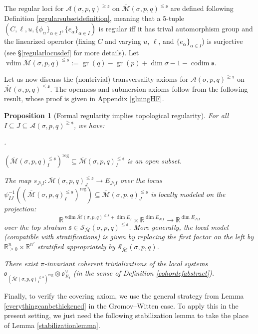 \documentclass[12pt]{article}
\newtheorem{proposition}[theorem]{Proposition}
\theoremstyle{definition}
\theoremstyle{remark}
\numberwithin{equation}{subsection}
\newcommand{\s}{\mathfrak s}
\newcommand{\oo}{\mathfrak o}
\newcommand{\RR}{\mathbb R}
\newcommand{\SSS}{\mathcal S}
\newcommand{\A}{\mathcal A}
\newcommand{\Mbar}{\overline{\mathcal M}}
\newcommand{\codim}{\operatorname{codim}}
\newcommand{\vdim}{\operatorname{vdim}}
\newcommand{\gr}{\operatorname{gr}}
\newcommand{\reg}{\mathrm{reg}}
\newcounter{rcounti}
\newenvironment{rlist}{\begin{list}{\roman{rcounti}.}{\usecounter{rcounti}
\setlength\itemsep{0pt}
\setlength\labelsep{4pt}
\setlength\labelwidth{16pt}
\setlength\leftmargin{32pt}
\setlength\listparindent{0pt}
\setlength\parsep{0pt}
\setlength\parskip{0pt}
\setlength\partopsep{0pt}
\setlength\rightmargin{0pt}
\setlength\topsep{0pt}
\setlength\itemindent{0pt}
}}{\end{list}}
\begin{document}
The regular loci for $\A(\sigma,p,q)^{\geq\s}$ on $\Mbar(\sigma,p,q)^{\leq\s}$ are defined following Definition \ref{regularsubsetdefinition}, meaning that a $5$-tuple $(C,\ell,u,\{\phi_\alpha\}_{\alpha\in I},\{e_\alpha\}_{\alpha\in I})$ is regular iff it has trival automorphism group and the linearized operator (fixing $C$ and varying $u$, $\ell$, and $\{e_\alpha\}_{\alpha\in I}$) is surjective (see \S\ref{regularlocusdef} for more details).  Let $\vdim\Mbar(\sigma,p,q)^{\leq\s}:=\gr(q)-\gr(p)+\dim\sigma-1-\codim\s$.

Let us now discuss the (nontrivial) transversality axioms for $\A(\sigma,p,q)^{\geq\s}$ on $\Mbar(\sigma,p,q)^{\leq\s}$.  The openness and submersion axioms follow from the following result, whose proof is given in Appendix \ref{gluingHF}.

\begin{proposition}[Formal regularity implies topological regularity]\label{HFgluingneeded}
For all $I\subseteq J\subseteq\A(\sigma,p,q)^{\geq\s}$, we have:
\begin{rlist}
\item$(\Mbar(\sigma,p,q)^{\leq\s}_I)^\reg\subseteq\Mbar(\sigma,p,q)^{\leq\s}_I$ is an open subset.
\item The map $s_{J\setminus I}:\Mbar(\sigma,p,q)^{\leq\s}_J\to E_{J\setminus I}$ over the locus $\psi_{IJ}^{-1}((\Mbar(\sigma,p,q)_I^{\leq\s})^\reg)\subseteq\Mbar(\sigma,p,q)^{\leq\s}_J$ is locally modeled on the projection:
\begin{equation}
\RR^{\vdim\Mbar(\sigma,p,q)^{\leq\s}+\dim E_I}\times\RR^{\dim E_{J\setminus I}}\to\RR^{\dim E_{J\setminus I}}
\end{equation}
over the top stratum $\s\in\SSS_{\Mbar}(\sigma,p,q)^{\leq\s}$.  More generally, the local model (compatible with stratifications) is given by replacing the first factor on the left by $\RR_{\geq 0}^n\times\RR^{n'}$ stratified appropriately by $\SSS_{\Mbar}(\sigma,p,q)$.
\item There exist $\pi$-invariant coherent trivializations of the local systems $\oo_{(\Mbar(\sigma,p,q)^{\leq\s}_I)^\reg}\otimes\oo_{E_I}^\vee$ (in the sense of Definition \ref{cohordefabstract}).
\end{rlist}
\end{proposition}

Finally, to verify the covering axiom, we use the general strategy from Lemma \ref{everythingcanbethickened} in the Gromov--Witten case.  To apply this in the present setting, we just need the following stabilization lemma to take the place of Lemma \ref{stabilizationlemma}.
\end{document}
